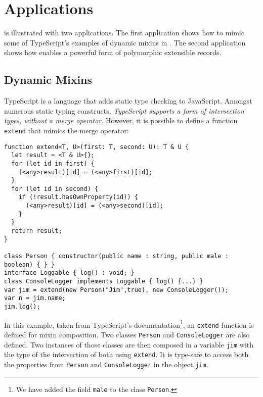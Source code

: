 \section{Applications}
\label{subsec:records}

\name is illustrated with two applications. The
first application shows how to mimic some of TypeScript's examples of 
dynamic mixins in \name. The second application shows how \name
enables a powerful form of polymorphic extensible records.

\subsection{Dynamic Mixins}\label{subsec:mixins}
TypeScript is a language that adds static type checking to JavaScript.
Amongst numerous static typing constructs, \emph{TypeScript supports a form of intersection types, 
without a merge operator}. 
However, it is possible to define a function \lstinline{extend}
that mimics the merge operator:

\begin{lstlisting}
function extend<T, U>(first: T, second: U): T & U {
  let result = <T & U>{};
  for (let id in first) {
    (<any>result)[id] = (<any>first)[id];
  }
  for (let id in second) {
    if (!result.hasOwnProperty(id)) {
      (<any>result)[id] = (<any>second)[id];
    }
  }
  return result;
}

class Person { constructor(public name : string, public male : boolean) { } }
interface Loggable { log() : void; }
class ConsoleLogger implements Loggable { log() {...} }
var jim = extend(new Person("Jim",true), new ConsoleLogger());
var n = jim.name;
jim.log(); 
\end{lstlisting}

In this example, taken from TypeScript's documentation\footnote{We have added the field \lstinline$male$ to the class
\lstinline$Person$.}, 
an \lstinline$extend$ function is defined 
for mixin composition. Two classes \lstinline$Person$ and
\lstinline$ConsoleLogger$ are also defined.
Two instances of those classes are then composed in a variable \lstinline$jim$ with the type of 
the intersection of both using \lstinline{extend}. It is type-safe to access both the properties
from \lstinline$Person$ and \lstinline$ConsoleLogger$ in the object \lstinline$jim$.

